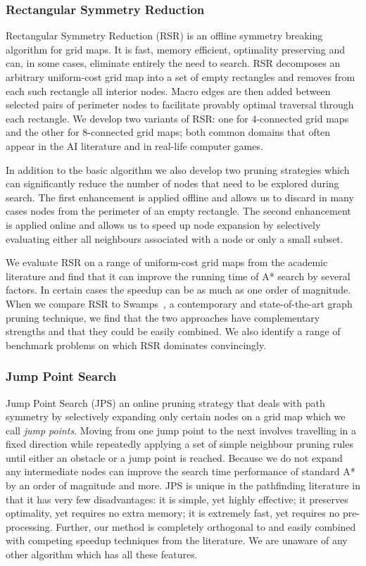 \subsubsection{Rectangular Symmetry Reduction}
\label{cha::intro::contributions::rsr}
Rectangular Symmetry Reduction (RSR) is an offline symmetry breaking algorithm
for grid maps. It is fast, memory efficient, optimality preserving and can, in
some cases, eliminate entirely the need to search.  RSR decomposes an
arbitrary uniform-cost grid map into a set of empty rectangles and removes
from each such rectangle all interior nodes.  Macro edges are then added
between selected pairs of perimeter nodes to facilitate provably optimal
traversal through each rectangle.  We develop two variants of RSR: one for
4-connected grid maps and the other for 8-connected grid maps; both common
domains that often appear in the AI literature and in real-life computer
games.

In addition to the basic algorithm we also develop two pruning strategies
which can significantly reduce the number of nodes that need to be explored
during search.  The first enhancement is applied offline and allows us to
discard in many cases nodes from the perimeter of an empty rectangle. The
second enhancement is applied online and allows us to speed up node expansion
by selectively evaluating either all neighbours associated with a node or only
a small subset.

We evaluate RSR on a range of uniform-cost grid maps from the academic
literature and find that it can improve the running time of A* search by
several factors. In certain cases the speedup can be as much as one order of
magnitude. When we compare RSR to Swamps~\citep{pochter10}, a contemporary and
state-of-the-art graph pruning technique, we find that the two approaches have
complementary strengths and that they could be easily combined. We also
identify a range of benchmark problems on which RSR dominates convincingly.

\subsubsection{Jump Point Search}
\label{cha::intro::contributions::jps}
Jump Point Search (JPS) an online pruning strategy that deals with path
symmetry by selectively expanding only certain nodes on a grid map which we
call \emph{jump points}.  Moving from one jump point to the next involves
travelling in a fixed direction while repeatedly applying a set of simple
neighbour pruning rules until either an obstacle or a jump point is reached.
Because we do not expand any intermediate nodes can improve the search time
performance of standard A{*} by an order of magnitude and more.  JPS is unique
in the pathfinding literature in that it has very few disadvantages: it is
simple, yet highly effective; it preserves optimality, yet requires no extra
memory;  it is extremely fast, yet requires no pre-processing.  Further, our
method is completely orthogonal to and easily combined with competing speedup
techniques from the literature.  We are unaware of any other algorithm which
has all these features.

